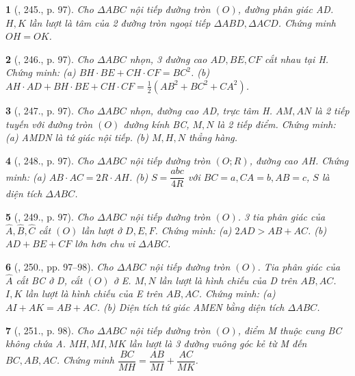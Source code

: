 \documentclass{article}
\newtheorem{baitoan}{}
\begin{document}
\begin{baitoan}[\cite{Binh_Toan_9_tap_2}, 245., p. 97]
	Cho $\Delta ABC$ nội tiếp đường tròn $(O)$, đường phân giác AD. $H,K$ lần lượt là tâm của 2 đường tròn ngoại tiếp $\Delta ABD,\Delta ACD$. Chứng minh $OH = OK$.
\end{baitoan}

\begin{baitoan}[\cite{Binh_Toan_9_tap_2}, 246., p. 97]
	Cho $\Delta ABC$ nhọn, 3 đường cao $AD,BE,CF$ cắt nhau tại H. Chứng minh: (a) $BH\cdot BE + CH\cdot CF = BC^2$. (b) $AH\cdot AD + BH\cdot BE + CH\cdot CF = \frac{1}{2}(AB^2 + BC^2 + CA^2)$.
\end{baitoan}

\begin{baitoan}[\cite{Binh_Toan_9_tap_2}, 247., p. 97]
	Cho $\Delta ABC$ nhọn, đường cao AD, trực tâm H. $AM,AN$ là 2 tiếp tuyến với đường tròn $(O)$ đường kính BC, $M,N$ là 2 tiếp điểm. Chứng minh: (a) AMDN là tứ giác nội tiếp. (b) $M,H,N$ thẳng hàng.
\end{baitoan}

\begin{baitoan}[\cite{Binh_Toan_9_tap_2}, 248., p. 97]
	Cho $\Delta ABC$ nội tiếp đường tròn $(O;R)$, đường cao AH. Chứng minh: (a) $AB\cdot AC = 2R\cdot AH$. (b) $S = \dfrac{abc}{4R}$ với $BC = a,CA = b,AB = c$, $S$ là diện tích $\Delta ABC$.
\end{baitoan}

\begin{baitoan}[\cite{Binh_Toan_9_tap_2}, 249., p. 97]
	Cho $\Delta ABC$ nội tiếp đường tròn $(O)$. 3 tia phân giác của $\widehat{A},\widehat{B},\widehat{C}$ cắt $(O)$ lần lượt ở $D,E,F$. Chứng minh: (a) $2AD > AB + AC$. (b) $AD + BE + CF$ lớn hơn chu vi $\Delta ABC$.
\end{baitoan}

\begin{baitoan}[\cite{Binh_Toan_9_tap_2}, 250., pp. 97--98]
	Cho $\Delta ABC$ nội tiếp đường tròn $(O)$. Tia phân giác của $\widehat{A}$ cắt BC ở D, cắt $(O)$ ở E. $M,N$ lần lượt là hình chiếu của D trên $AB,AC$. $I,K$ lần lượt là hình chiếu của E trên $AB,AC$. Chứng minh: (a) $AI + AK = AB + AC$. (b) Diện tích tứ giác AMEN bằng diện tích $\Delta ABC$.
\end{baitoan}

\begin{baitoan}[\cite{Binh_Toan_9_tap_2}, 251., p. 98]
	Cho $\Delta ABC$ nội tiếp đường tròn $(O)$, điểm M thuộc cung BC không chứa A. $MH,MI,MK$ lần lượt là 3 đường vuông góc kẻ từ M đến $BC,AB,AC$. Chứng minh $\dfrac{BC}{MH} = \dfrac{AB}{MI} + \dfrac{AC}{MK}$.
\end{baitoan}
\end{document}
